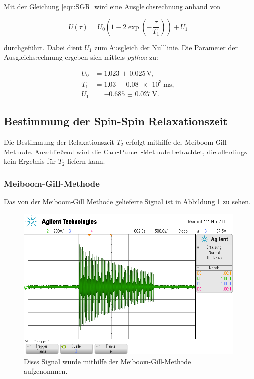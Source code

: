 Mit der Gleichung \eqref{eqn:SGR} wird eine Ausgleichsrechnung
anhand von 

\begin{equation*}
  U\left(\tau\right) = U_0 \left(1-2\exp{\left(-\frac{\tau}{T_1}\right)}\right) + U_1
\end{equation*}

durchgeführt. Dabei dient $U_1$ zum Ausgleich der Nulllinie. 
Die Parameter der Ausgleichsrechnung ergeben sich mittels \textit{python} zu:

\begin{align}
  U_0 &= \SI{1.023(25)}{\volt},\\
  T_1 &= \SI{1.03(8)e3}{\milli\second},\\
  U_1 &= \SI{-0.685(27)}{\volt}.
\end{align}

\subsection{Bestimmung der Spin-Spin Relaxationszeit}

Die Bestimmung der Relaxationszeit $T_2$ erfolgt mithilfe der Meiboom-Gill-Methode. Anschließend wird die Carr-Purcell-Methode 
betrachtet, die allerdings kein Ergebnis für $T_2$ liefern kann.

\subsubsection{Meiboom-Gill-Methode}

Das von der Meiboom-Gill Methode gelieferte Signal ist in Abbildung \ref{fig:mgm} zu sehen. 

\begin{figure}
  \centering
  \includegraphics[scale=0.4]{content/mgm.png}
  \caption{Dises Signal wurde mithilfe der Meiboom-Gill-Methode aufgenommen.}
  \label{fig:mgm}
\end{figure}

